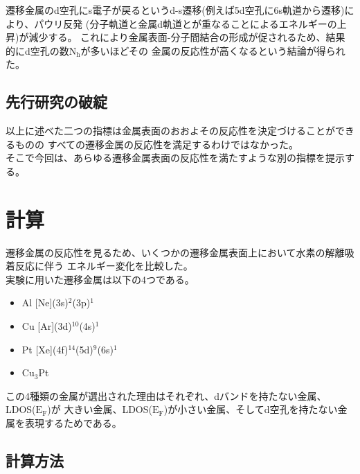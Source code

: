 \documentclass[12pt]{ltjsarticle}
\begin{document}
遷移金属のd空孔にs電子が戻るというd-s遷移(例えば5d空孔に6s軌道から遷移)により、パウリ反発
(分子軌道と金属d軌道とが重なることによるエネルギーの上昇)が減少する。\cite{MORIKAWA2006}
これにより金属表面-分子間結合の形成が促されるため、結果的にd空孔の数$\text{N}_\text{h}$が多いほどその
金属の反応性が高くなるという結論が得られた。\cite{J.Harris1985}

\subsection{先行研究の破綻}
以上に述べた二つの指標は金属表面のおおよその反応性を決定づけることができるものの
すべての遷移金属の反応性を満足するわけではなかった。\\
そこで今回は、あらゆる遷移金属表面の反応性を満たすような別の指標を提示する。\cite{Science1995}

\section{計算}
遷移金属の反応性を見るため、いくつかの遷移金属表面上において水素の解離吸着反応に伴う
エネルギー変化を比較した。\\

実験に用いた遷移金属は以下の4つである。

\begin{itemize}
 \item Al [Ne](3s)$^\text{2}$(3p)$^\text{1}$
 \item Cu [Ar](3d)$^\text{10}$(4s)$^\text{1}$
 \item Pt [Xe](4f)$^\text{14}$(5d)$^\text{9}$(6s)$^\text{1}$
 \item $\text{Cu}_\text{3}$Pt
\end{itemize}
この4種類の金属が選出された理由はそれぞれ、dバンドを持たない金属、LDOS($\text{E}_\text{F}$)が
大きい金属、LDOS($\text{E}_\text{F}$)が小さい金属、そしてd空孔を持たない金属を表現するためである。

\subsection{計算方法}
\end{document}
